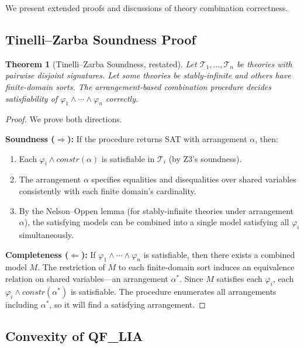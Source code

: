 \documentclass[10pt]{article}
\theoremstyle{plain}
\newtheorem{theorem}{Theorem}[section]
\theoremstyle{definition}
\theoremstyle{remark}
\begin{document}
We present extended proofs and discussions of theory combination
correctness.

\subsection{Tinelli--Zarba Soundness Proof}

\begin{theorem}[Tinelli--Zarba Soundness, restated]
Let $\mathcal{T}_1, \ldots, \mathcal{T}_n$ be theories with
pairwise disjoint signatures.  Let some theories be stably-infinite
and others have finite-domain sorts.  The arrangement-based
combination procedure decides satisfiability of
$\varphi_1 \land \cdots \land \varphi_n$ correctly.
\end{theorem}

\begin{proof}
We prove both directions.

\textbf{Soundness ($\Rightarrow$):} If the procedure returns SAT
with arrangement $\alpha$, then:
\begin{enumerate}[nosep]
  \item Each $\varphi_i \land \mathit{constr}(\alpha)$ is
    satisfiable in $\mathcal{T}_i$ (by Z3's soundness).
  \item The arrangement $\alpha$ specifies equalities and
    disequalities over shared variables consistently with each
    finite domain's cardinality.
  \item By the Nelson--Oppen lemma (for stably-infinite theories
    under arrangement $\alpha$), the satisfying models can be
    combined into a single model satisfying all $\varphi_i$
    simultaneously.
\end{enumerate}

\textbf{Completeness ($\Leftarrow$):} If
$\varphi_1 \land \cdots \land \varphi_n$ is satisfiable, then
there exists a combined model $M$.  The restriction of $M$ to
each finite-domain sort induces an equivalence relation on
shared variables---an arrangement $\alpha^*$.  Since $M$ satisfies
each $\varphi_i$, each $\varphi_i \land \mathit{constr}(\alpha^*)$
is satisfiable.  The procedure enumerates all arrangements including
$\alpha^*$, so it will find a satisfying arrangement.
\end{proof}

\subsection{Convexity of QF\_LIA}
\end{document}
